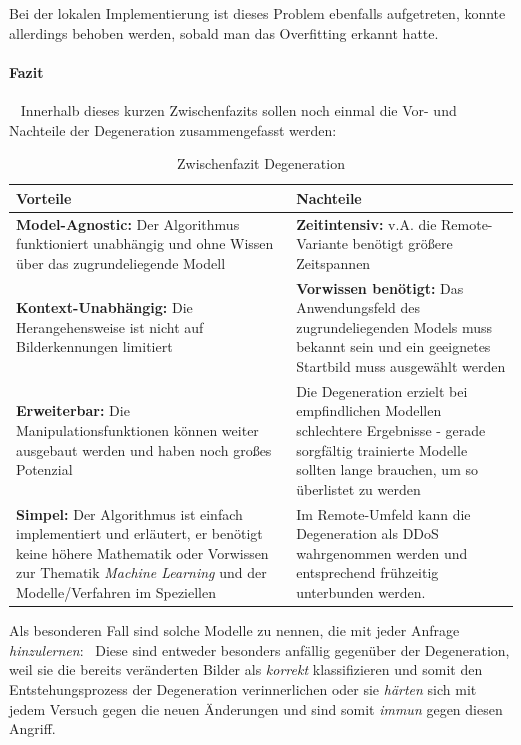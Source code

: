 Bei der lokalen Implementierung ist dieses Problem ebenfalls aufgetreten, konnte allerdings behoben werden, sobald man das Overfitting erkannt hatte.
\paragraph{Fazit} ~\newline
Innerhalb dieses kurzen Zwischenfazits sollen noch einmal die Vor- und Nachteile der Degeneration zusammengefasst werden:
\begin{table}[h]
	\centering
\begin{tabular}{|p{7.5cm}|p{7.5cm}|}
	\hline 
	\textbf{Vorteile} & \textbf{Nachteile} \\ 
	\hline 
	\textbf{Model-Agnostic:} \newline Der Algorithmus funktioniert unabhängig und ohne Wissen über das zugrundeliegende Modell & \textbf{Zeitintensiv:} \newline v.A. die Remote-Variante benötigt größere Zeitspannen \\ 
	\hline 
	\textbf{Kontext-Unabhängig:} \newline Die Herangehensweise ist nicht auf Bilderkennungen limitiert & \textbf{Vorwissen benötigt:} \newline Das Anwendungsfeld des zugrundeliegenden Models muss bekannt sein und ein geeignetes Startbild muss ausgewählt werden  \\ 
	\hline 
	\textbf{Erweiterbar:} \newline Die Manipulationsfunktionen können weiter ausgebaut werden und haben noch großes Potenzial & Die Degeneration erzielt bei empfindlichen Modellen schlechtere Ergebnisse - gerade sorgfältig trainierte Modelle sollten lange brauchen, um so überlistet zu werden \\ 
	\hline 
	\textbf{Simpel:} \newline Der Algorithmus ist einfach implementiert und erläutert, er benötigt keine höhere Mathematik oder Vorwissen zur Thematik \textit{Machine Learning} und der Modelle/Verfahren im Speziellen & Im Remote-Umfeld kann die Degeneration als DDoS wahrgenommen werden und entsprechend frühzeitig unterbunden werden. \\ 
	\hline 
\end{tabular} 
\caption{Zwischenfazit Degeneration}
\label{tab:FazitDegeneration}
\end{table}

Als besonderen Fall sind solche Modelle zu nennen, die mit jeder Anfrage \textit{hinzulernen}: 
~\newline Diese sind entweder besonders anfällig gegenüber der Degeneration, weil sie die bereits veränderten Bilder als \textit{korrekt} klassifizieren und somit den Entstehungsprozess der Degeneration verinnerlichen oder sie \textit{härten} sich mit jedem Versuch gegen die neuen Änderungen und sind somit \textit{immun} gegen diesen Angriff.  


